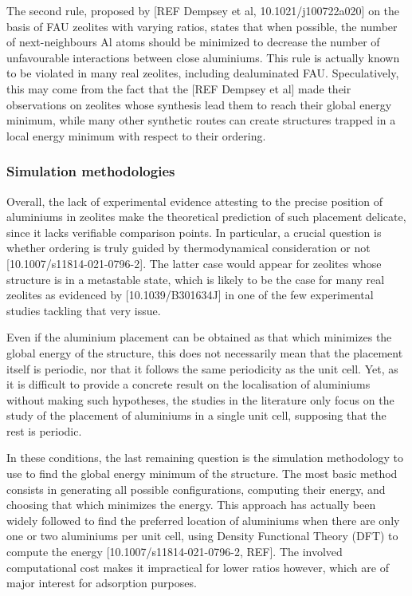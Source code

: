 \documentclass[main.tex]{subfiles}
\begin{document}
The second rule, proposed by [REF Dempsey et al, 10.1021/j100722a020] on the basis of FAU zeolites with varying \SiAl ratios, states that when possible, the number of next-neighbours Al atoms should be minimized to decrease the number of unfavourable interactions between close aluminiums. This rule is actually known to be violated in many real zeolites, including dealuminated FAU. Speculatively, this may come from the fact that the [REF Dempsey et al] made their observations on zeolites whose synthesis lead them to reach their global energy minimum, while many other synthetic routes can create structures trapped in a local energy minimum with respect to their \SiAl ordering.

\subsubsection{Simulation methodologies}

Overall, the lack of experimental evidence attesting to the precise position of aluminiums in zeolites make the theoretical prediction of such placement delicate, since it lacks verifiable comparison points. In particular, a crucial question is whether \SiAl ordering is truly guided by thermodynamical consideration or not [10.1007/s11814-021-0796-2]. The latter case would appear for zeolites whose structure is in a metastable state, which is likely to be the case for many real zeolites as evidenced by [10.1039/B301634J] in one of the few experimental studies tackling that very issue.

Even if the aluminium placement can be obtained as that which minimizes the global energy of the structure, this does not necessarily mean that the placement itself is periodic, nor that it follows the same periodicity as the unit cell. Yet, as it is difficult to provide a concrete result on the localisation of aluminiums without making such hypotheses, the studies in the literature only focus on the study of the placement of aluminiums in a single unit cell, supposing that the rest is periodic.

In these conditions, the last remaining question is the simulation methodology to use to find the global energy minimum of the structure. The most basic method consists in generating all possible configurations, computing their energy, and choosing that which minimizes the energy. This approach has actually been widely followed to find the preferred location of aluminiums when there are only one or two aluminiums per unit cell, using Density Functional Theory (DFT) to compute the energy [10.1007/s11814-021-0796-2, REF]. The involved computational cost makes it impractical for lower \SiAl ratios however, which are of major interest for adsorption purposes.
\end{document}
